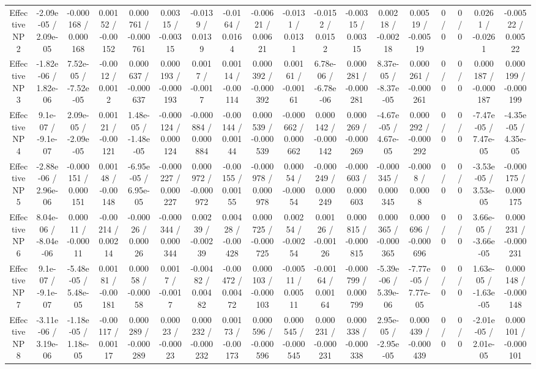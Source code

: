 \documentclass[10pt]{article}
\begin{document}
\begin{table}[htbp]
\begin{center}
\begin{tabular}{|c|c|c|c|c|c|c|c|c|c|c|c|c|c|c|c|c|c|}
  Effective NP 2 & -2.09e-05 / 2.09e-05 & -0.000168 / 0.000168 & 0.00152 / -0.00152 & 0.000761 / -0.000761 & 0.00315 / -0.00315 & -0.0139 / 0.0139 & -0.0164 / 0.0164 & -0.00621 / 0.00621 & -0.0131 / 0.0131 & -0.0152 / 0.0152 & -0.00315 / 0.00315 & 0.00218 / -0.00218 & 0.00519 / -0.00519 & 0 / 0 & 0 / 0 & 0.0261 / -0.0261 & -0.00522 / 0.00522 \\ 
  Effective NP 3 & -1.82e-06 / 1.82e-06 & 7.52e-05 / -7.52e-05 & -0.0012 / 0.0012 & 0.000637 / -0.000637 & 0.000193 / -0.000193 & 0.0017 / -0.0017 & 0.00114 / -0.00114 & 0.000392 / -0.000392 & 0.00161 / -0.00161 & 6.78e-06 / -6.78e-06 & 0.000281 / -0.000281 & 8.37e-05 / -8.37e-05 & 0.000261 / -0.000261 & 0 / 0 & 0 / 0 & 0.000187 / -0.000187 & 0.000199 / -0.000199 \\ 
  Effective NP 4 & 9.1e-07 / -9.1e-07 & 2.09e-05 / -2.09e-05 & 0.00121 / -0.00121 & 1.48e-05 / -1.48e-05 & -0.000124 / 0.000124 & -0.000884 / 0.000884 & -0.00144 / 0.00144 & 0.000539 / -0.000539 & -0.000662 / 0.000662 & 0.000142 / -0.000142 & 0.000269 / -0.000269 & -4.67e-05 / 4.67e-05 & 0.000292 / -0.000292 & 0 / 0 & 0 / 0 & -7.47e-05 / 7.47e-05 & -4.35e-05 / 4.35e-05 \\ 
  Effective NP 5 & -2.88e-06 / 2.96e-06 & -0.000151 / 0.000151 & 0.00148 / -0.00148 & -6.95e-05 / 6.95e-05 & -0.000227 / 0.000227 & 0.000972 / -0.000972 & -0.00155 / 0.00155 & -0.000978 / 0.000978 & 0.00054 / -0.00054 & -0.000249 / 0.000249 & -0.000603 / 0.000603 & -0.000345 / 0.000345 & -0.0008 / 0.0008 & 0 / 0 & 0 / 0 & -3.53e-05 / 3.53e-05 & -0.000175 / 0.000175 \\ 
  Effective NP 6 & 8.04e-06 / -8.04e-06 & 0.00011 / -0.00011 & -0.00214 / 0.00214 & -0.00026 / 0.00026 & -0.000344 / 0.000344 & 0.00239 / -0.00239 & 0.00428 / -0.00428 & 0.000725 / -0.000725 & 0.00254 / -0.00254 & 0.00126 / -0.00126 & 0.000815 / -0.000815 & 0.000365 / -0.000365 & 0.000696 / -0.000696 & 0 / 0 & 0 / 0 & 3.66e-05 / -3.66e-05 & 0.000231 / -0.000231 \\ 
  Effective NP 7 & 9.1e-07 / -9.1e-07 & -5.48e-05 / 5.48e-05 & 0.00181 / -0.00181 & 0.00058 / -0.00058 & 0.0017 / -0.0017 & -0.00482 / 0.00482 & -0.00472 / 0.00472 & 0.000103 / -0.000103 & -0.00511 / 0.00511 & -0.00164 / 0.00164 & -0.000799 / 0.000799 & -5.39e-06 / 5.39e-06 & -7.77e-05 / 7.77e-05 & 0 / 0 & 0 / 0 & 1.63e-05 / -1.63e-05 & 0.000148 / -0.000148 \\ 
  Effective NP 8 & -3.11e-06 / 3.19e-06 & -1.18e-05 / 1.18e-05 & -0.00117 / 0.00117 & 0.000289 / -0.000289 & 0.00023 / -0.00023 & 0.000232 / -0.000232 & 0.00173 / -0.00173 & 0.000596 / -0.000596 & 0.000545 / -0.000545 & 0.000231 / -0.000231 & 0.000338 / -0.000338 & 2.95e-05 / -2.95e-05 & 0.000439 / -0.000439 & 0 / 0 & 0 / 0 & -2.01e-05 / 2.01e-05 & 0.000101 / -0.000101 \\ 

\end{tabular}
\end{center}
\end{table}
\end{document}
